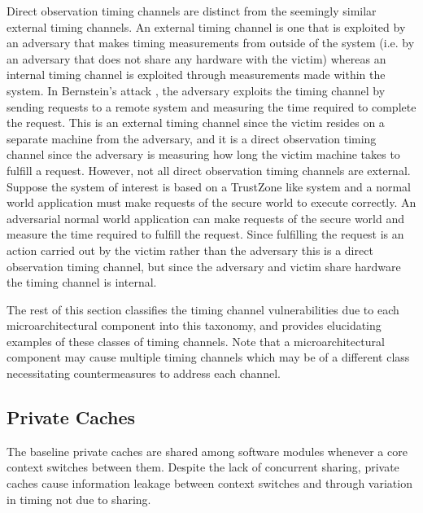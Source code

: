 Direct observation timing channels are distinct from the seemingly similar 
external timing channels. An external timing channel is one that is exploited 
by an adversary that makes timing measurements from outside of the system (i.e.  
by an adversary that does not share any hardware with the victim) whereas an 
internal timing channel is exploited through measurements made within the 
system. In Bernstein's attack \cite{bernstein}, the adversary exploits the 
timing channel by sending requests to a remote system and measuring the time 
required to complete the request. This is an external timing channel since the 
victim resides on a separate machine from the adversary, and it is a direct 
observation timing channel since the adversary is measuring how long the victim 
machine takes to fulfill a request. However, not all direct observation timing 
channels are external. Suppose the system of interest is based on a TrustZone 
like system and a normal world application must make requests of the secure 
world to execute correctly. An adversarial normal world application can make 
requests of the secure world and measure the time required to fulfill the 
request. Since fulfilling the request is an action carried out by the victim 
rather than the adversary this is a direct observation timing channel, but 
since the adversary and victim share hardware the timing channel is internal.

The rest of this section classifies the timing channel vulnerabilities due to 
each microarchitectural component into this taxonomy, and provides elucidating 
examples of these classes of timing channels. Note that a microarchitectural 
component may cause multiple timing channels which may be of a different class 
necessitating countermeasures to address each channel.

\subsection{Private Caches}
\label{sec:priv_cache}
The baseline private caches are shared among software modules whenever a core 
context switches between them. Despite the lack of concurrent sharing, private 
caches cause information leakage between context switches and through variation 
in timing not due to sharing.

